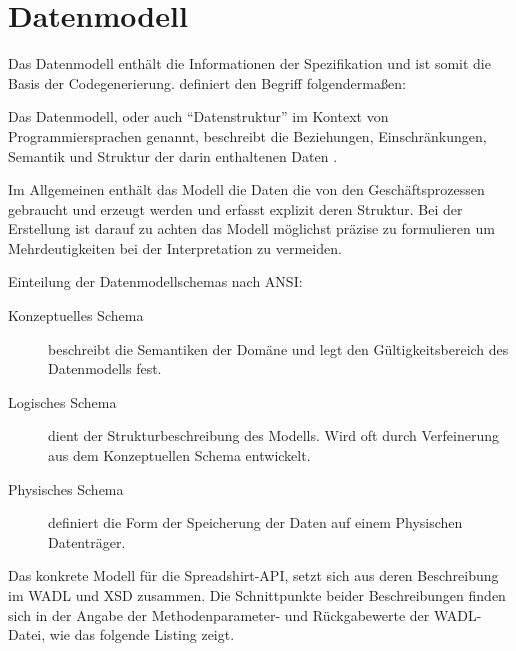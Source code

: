 \section{Datenmodell}
\label{section:datamodel}

Das Datenmodell enthält die Informationen der Spezifikation und ist somit die Basis der Codegenerierung. \citeauthor{wiki:datamodel} definiert den Begriff folgendermaßen:
\begin{thesisDefinition}[Datenmodell]
Das Datenmodell, oder auch \enquote{Datenstruktur} im Kontext von Programmiersprachen genannt, beschreibt die Beziehungen, Einschränkungen, Semantik und Struktur der darin enthaltenen Daten \cite{wiki:datamodel}.
\end{thesisDefinition}

Im Allgemeinen enthält das Modell die Daten die von den Geschäftsprozessen gebraucht und erzeugt werden und erfasst explizit deren Struktur. Bei der Erstellung ist darauf zu achten das Modell möglichst präzise zu formulieren um Mehrdeutigkeiten bei der Interpretation zu vermeiden. 

Einteilung der Datenmodellschemas nach ANSI:
\begin{description}
    \item[Konzeptuelles Schema]
        beschreibt die Semantiken der Domäne und legt den Gültigkeitsbereich des Datenmodells fest.
    \item[Logisches Schema]
        dient der Strukturbeschreibung des Modells. Wird oft durch Verfeinerung aus dem Konzeptuellen Schema entwickelt.
    \item[Physisches Schema]
        definiert die Form der Speicherung der Daten auf einem Physischen Datenträger.
\end{description}

Das konkrete Modell für die Spreadshirt-API, setzt sich aus deren Beschreibung im \gls{WADL} und \gls{XSD} zusammen. Die Schnittpunkte beider Beschreibungen finden sich in der Angabe der Methodenparameter- und Rückgabewerte der \gls{WADL}-Datei, wie das folgende Listing zeigt.

